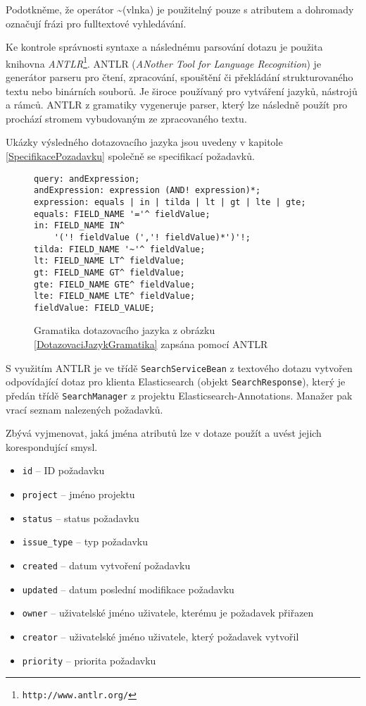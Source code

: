 \documentclass[11pt,oneside]{fithesis2}
\begin{document}
Podotkněme, že operátor \textasciitilde  (vlnka) je použitelný pouze s atributem  a dohromady označují frázi pro fulltextové vyhledávání.

Ke kontrole správnosti syntaxe a následnému parsování dotazu je použita knihovna \emph{ANTLR}\footnote{\texttt{http://www.antlr.org/}}. ANTLR (\emph{ANother Tool for Language Recognition}) je generátor parseru pro čtení, zpracování, spouštění či překládání strukturovaného textu nebo binárních souborů. Je široce používaný pro vytváření jazyků, nástrojů a rámců. ANTLR z gramatiky vygeneruje parser, který lze následně použít pro prochází stromem vybudovaným ze zpracovaného textu. \cite{ANTLR}

Ukázky výsledného dotazovacího jazyka jsou uvedeny v kapitole \ref{SpecifikacePozadavku} společně se specifikací požadavků.

\begin{figure}[htb]
\begin{lstlisting}[frame=single]
query: andExpression;
andExpression: expression (AND! expression)*;
expression: equals | in | tilda | lt | gt | lte | gte;
equals: FIELD_NAME '='^ fieldValue;
in: FIELD_NAME IN^
    '('! fieldValue (','! fieldValue)*')'!;
tilda: FIELD_NAME '~'^ fieldValue;
lt: FIELD_NAME LT^ fieldValue;
gt: FIELD_NAME GT^ fieldValue;
gte: FIELD_NAME GTE^ fieldValue;
lte: FIELD_NAME LTE^ fieldValue;
fieldValue: FIELD_VALUE;
\end{lstlisting}
\caption{Gramatika dotazovacího jazyka z obrázku \ref{DotazovaciJazykGramatika} zapsána pomocí ANTLR}
\label{DotazovaciJazykGramatikaAntlr}
\end{figure}

S využitím ANTLR je ve třídě \texttt{SearchServiceBean} z textového dotazu vytvořen odpovídající dotaz pro klienta Elasticsearch (objekt \texttt{SearchResponse}), který je předán třídě \texttt{SearchManager} z projektu Elasticsearch-Annotations. Manažer pak vrací seznam nalezených požadavků.

Zbývá vyjmenovat, jaká jména atributů lze v dotaze použít a uvést jejich korespondující smysl.

\begin{itemize}
	\item \texttt{id} -- ID požadavku
	\item \texttt{project} -- jméno projektu
	\item \texttt{status} -- status požadavku
	\item \texttt{issue\_type} -- typ požadavku
	\item \texttt{created} -- datum vytvoření požadavku
	\item \texttt{updated} -- datum poslední modifikace požadavku
	\item \texttt{owner} -- uživatelské jméno uživatele, kterému je požadavek přiřazen
	\item \texttt{creator} -- uživatelské jméno uživatele, který požadavek vytvořil
	\item \texttt{priority} -- priorita požadavku
\end{itemize}
\end{document}
